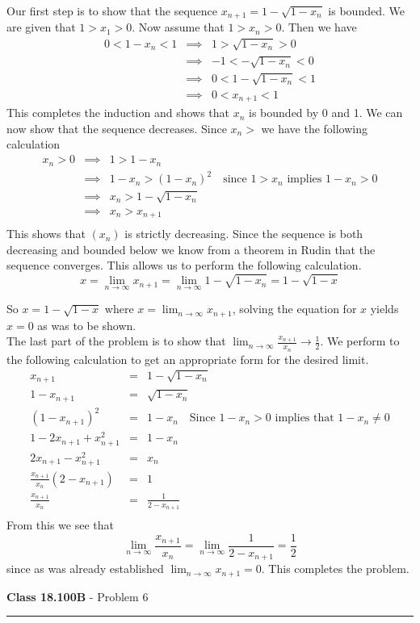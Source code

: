\documentclass[11pt,reqno]{article}
\begin{document}
Our first step is to show that the sequence $x_{n+1} = 1 - \sqrt{1-x_n}$ is bounded. We are given that $1 > x_1 > 0$. Now assume that $1 > x_n > 0$. Then we have
\begin{eqnarray*}
 0 < 1 - x_n < 1 &\implies& 1 > \sqrt{1- x_n} > 0 \\
                          &\implies& -1 < -\sqrt{1-x_n} < 0 \\
                          &\implies& 0 < 1 - \sqrt{1-x_n} < 1 \\
                          &\implies& 0 < x_{n+1} < 1
\end{eqnarray*}
This completes the induction and shows that $x_n$ is bounded by 0 and 1. We can now show that the sequence decreases. Since $x_n >$ we have the following calculation
\begin{eqnarray*}
x_n > 0 & \implies & 1 > 1 - x_n \\
	 & \implies & 1-x_n > (1-x_n)^2 \quad \text{since $1 > x_n$ implies $1 - x_n > 0$} \\
	 & \implies & x_n > 1 - \sqrt{1-x_n} \\
 	& \implies & x_n > x_{n+1} \\
\end{eqnarray*}
This shows that $(x_n)$ is strictly decreasing. Since the sequence is both decreasing and bounded below we know from a theorem in Rudin that the sequence converges. This allows us to perform the following calculation.
\[
x = \lim_{n \to \infty} x_{n+1} = \lim_{n \to \infty} 1 - \sqrt{1 - x_n} = 1- \sqrt{1 - x}
\]

So $x = 1 - \sqrt{1-x}$ where $x = \lim_{n \to \infty} x_{n+1}$, solving the equation for $x$ yields $x = 0$ as was to be shown.\\
\indent The last part of the problem is to show that $\lim_{n \to \infty}\frac{x_{n+1}}{x_n} \to \frac{1}{2}$. We perform to the following calculation to get an appropriate form for the desired limit.
\begin{eqnarray*}
x_{n+1} &=& 1 - \sqrt{1 - x_n} \\
1 - x_{n+1} &=& \sqrt{1 - x_n} \\
(1 - x_{n+1})^2 &=& 1 - x_n \quad \text{Since $1 - x_n > 0$ implies that $1 - x_n \neq 0$}\\
1 - 2 x_{n+1} + x_{n+1}^2 &=& 1 - x_n \\
2 x_{n+1} - x_{n+1}^2 &=& x_n \\
\frac{x_{n+1}}{x_n}(2 - x_{n+1})&=& 1 \\
\frac{x_{n+1}}{x_n}&=& \frac{1}{2 - x_{n+1}} \\
\end{eqnarray*}
 From this we see that \[\lim_{n \to \infty} \frac{x_{n+1}}{x_n} = \lim_{n \to \infty}\frac{1}{2-x_{n+1}} = \frac{1}{2}\] since as was already established $\lim_{n \to \infty} x_{n+1} = 0$. This completes the problem.
\vspace{15pt}
\begin{flushleft} 
\textbf{Class 18.100B} - Problem 6\\
\rule{500pt}{1pt}\\
\end{flushleft} 
\end{document}
